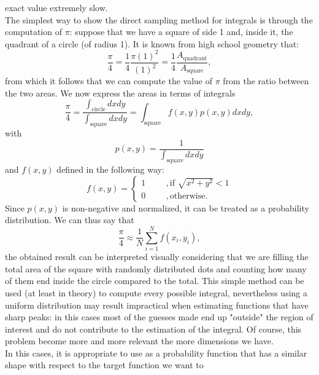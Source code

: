 exact value extremely slow.\\
The simplest way to show the direct sampling method for integrals is through the computation of $\pi$: suppose that we have a square of side 1 and, inside it, 
the quadrant of a circle (of radius 1). It is known from high school geometry that:
\begin{equation}
    \frac{\pi}{4}=\frac{1}{4}\frac{\pi(1)^2}{(1)^2}=\frac{1}{4}\frac{A_{\text{quadrant}}}{A_{\text{square}}},
\end{equation}
from which it follows that we can compute the value of $\pi$ from the ratio between the two areas.
We now express the areas in terms of integrals
\begin{equation}
    \frac{\pi}{4}=\frac{\int_{\text{circle}}dxdy}{\int_{\text{square}}dxdy}=\int_{\text{square}}f(x,y)p(x,y)dxdy,
\end{equation}
with
\begin{equation}
    p(x,y)=\frac{1}{\int_{\text{square}}dxdy}
\end{equation}
and $f(x,y)$ defined in the following way:
\begin{equation}
    f(x,y)=
    \begin{cases}
    1\hspace{1cm},\text{if }\sqrt{x^2+y^2}<1\\
    0\hspace{1cm},\text{otherwise}.    
    \end{cases}
\end{equation}
Since $p(x,y)$ is non-negative and normalized, it can be treated as a probability distribution. We can thus say that
\begin{equation}
    \frac{\pi}{4}\approx \frac{1}{N}\sum_{i=1}^N f(x_i,y_i),
\end{equation}
the obtained result can be interpreted visually considering that we are filling the total area of the square with randomly distributed dots 
and counting how many of them end inside the circle compared to the total.
This simple method can be used (at least in theory) to compute every possible integral, nevertheless using a uniform distribution may 
result impractical when estimating functions that have sharp peaks: in this cases most of the guesses made end up "outside" the region of interest 
and do not contribute to the estimation of the integral. Of course, this problem become more and more relevant the more dimensions we have.\\
In this cases, it is appropriate to use as a probability function that has a similar shape with respect to the target function we want to 
